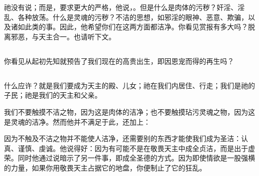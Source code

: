 \par

祂没有说；而是，要求更大的严格，他说，。但是什么是肉体的污秽？奸淫、淫乱、各种放荡。什么是灵魂的污秽？不洁的思想，如邪淫的眼神、恶意、欺骗，以及诸如此类的事。因此，他希望你们在这两方面都洁净。你看见赏报有多大吗？脱离邪恶，与天主合一。也请听下文。\par


\subsection{}

\par

你看见从起初先知就预告了我们现在的高贵出生，即因恩宠而得的再生吗？\par


\subsection{}

\par

什么应许？就是我们要成为天主的殿、儿女；祂在我们内居住、行走；我们是祂的子民；祂是我们的天主和父亲。\par

\par

我们不要触摸不洁之物，因为这是肉体的洁净；也不要触摸玷污灵魂之物，因为这是灵魂的洁净。然而他并不满足于此，还加上：\par

\newline{} 因为不触及不洁之物并不能使人洁净，还需要别的东西才能使我们成为圣洁：认真、谨慎、虔诚。他说得好：因为有可能不是在敬畏天主中成全贞洁，而是出于虚荣。同时他通过说暗示了另一件事，即成全圣德的方式。因为即使情欲是一股强横的力量，如果你用敬畏天主占据它的地盘，你便制止了它的狂乱。\par

